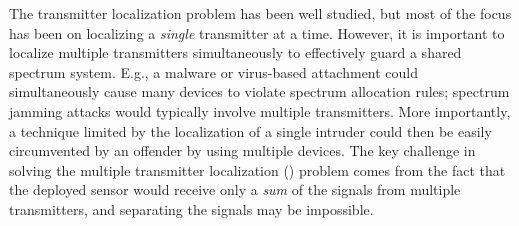   
The transmitter localization problem has been well studied, but most of the focus has been on localizing a {\em single} transmitter at a time. 
However, it is important to localize multiple transmitters simultaneously to effectively guard a shared spectrum
system. E.g., a malware or virus-based attachment could simultaneously 
cause many devices to violate spectrum allocation rules; spectrum
jamming attacks would typically involve multiple transmitters. More
importantly, a technique limited by the localization of a single intruder
could then be easily circumvented by an offender by using multiple
devices. The key challenge in solving the multiple transmitter localization (\mtl) 
problem comes from the fact that
the deployed sensor would receive only a {\em sum} of the signals from multiple transmitters, and separating the signals may be impossible. 

